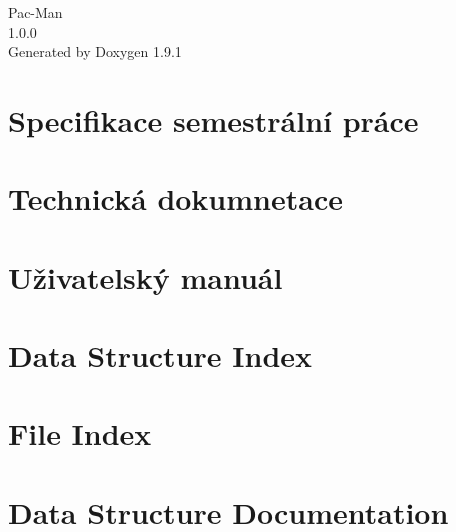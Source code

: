 \let\mypdfximage\pdfximage\def\pdfximage{\immediate\mypdfximage}\documentclass[twoside]{book}
\newcommand{\+}{\discretionary{\mbox{\scriptsize$\hookleftarrow$}}{}{}}
\newcommand{\clearemptydoublepage}{%
  \newpage{\pagestyle{empty}\cleardoublepage}%
}
\begin{document}
\raggedbottom

\begin{titlepage}
\vspace*{7cm}
\begin{center}%
{\Large Pac-\/\+Man \\[1ex]\large 1.\+0.\+0 }\\
\vspace*{1cm}
{\large Generated by Doxygen 1.9.1}\\
\end{center}
\end{titlepage}
\clearemptydoublepage
{}
\tableofcontents
\clearemptydoublepage
{}

\chapter{Specifikace semestrální práce}
\label{index}
\chapter{Technická dokumnetace}
\label{md__c___users__petr__documents_apo_semestralka__tech_documentation}

\chapter{Uživatelský manuál}
\label{md__c___users__petr__documents_apo_semestralka__user_manual}

\chapter{Data Structure Index}

\chapter{File Index}

\chapter{Data Structure Documentation}











\end{document}
